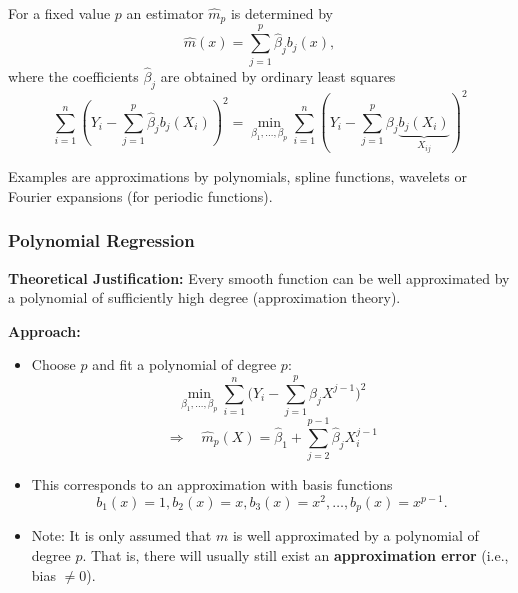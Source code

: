 \documentclass[14pt]{extreport}\usepackage[]{graphicx}\usepackage[]{xcolor}
\begin{document}
For a fixed value $p$ an estimator $\hat m_p$ is determined by
$$
\hat m(x)=\sum_{j=1}^p \hat\beta_j b_j(x),
$$
where the coefficients  $\hat\beta_j$ are obtained by ordinary least squares
$$
\sum_{i=1}^n \left( Y_i-\sum_{j=1}^p \hat\beta_j b_j(X_i)\right)^2
=\min_{\beta_1,\dots,\beta_p} \sum_{i=1}^n \left( Y_i-\sum_{j=1}^p \beta_j \underbrace{b_j(X_i)}_{X_{ij}}\right)^2
$$

\bigskip


Examples are approximations by polynomials, spline functions, wavelets or Fourier expansions (for periodic functions).


\subsubsection{Polynomial Regression}

\noindent 
\textbf{Theoretical Justification:} Every smooth function can be well approximated by a polynomial of sufficiently high degree (approximation theory).
\par\noindent

\bigskip

{\bf Approach:}
\begin{itemize}
\item Choose $p$ and fit a polynomial of degree $p$:
$$\min_{\beta_1,\dots,\beta_p}\sum_{i=1}^n \biggl(Y_i-
\sum_{j=1}^p {\beta}_{j} X^{j-1}\biggr)^2$$
$$\Rightarrow\quad {\hat m}_p(X)={\hat \beta}_{1}+\sum_{j=2}^{p-1}
{\hat \beta}_{j} X_i^{j-1}$$
\item This corresponds to an approximation with basis functions
 $$
 b_1(x)=1,b_2(x)=x,b_3(x)=x^2,\dots, b_{p}(x)=x^{p-1}.
 $$
\item  Note: It is only assumed that $m$ is well approximated by a polynomial of degree $p$. That is, there will usually still exist an \textbf{approximation error} (i.e., bias $\neq 0$).
\end{itemize}

\newpage
\end{document}
